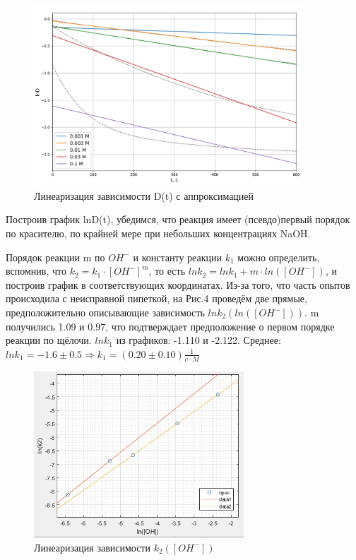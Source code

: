 \documentclass[a4paper, 12pt]{article}
\begin{document}
\begin{figure}[h!]
    \begin{center}
    \includegraphics[width=0.9\textwidth]{1 lnD.png}
    \end{center}
    \caption{Линеаризация зависимости D(t) с аппроксимацией}
\end{figure}

Построив график lnD(t), убедимся, что реакция имеет (псевдо)первый порядок по красителю, по крайней мере при небольших концентрациях NaOH.

Порядок реакции m по $OH^-$ и константу реакции $k_1$ можно определить, вспомнив, что $k_2 = k_1 \cdot [OH^-]^m$, то есть $ln k_2 = ln k_1 + m \cdot ln([OH^-])$, и построив график в соответствующих координатах. Из-за того, что часть опытов происходила с неисправной пипеткой, на Рис.4 проведём две прямые, предположительно описывающие зависимость $ln k_2 (ln([OH^-]))$. m получились 1.09 и 0.97, что подтверждает предположение о первом порядке реакции по щёлочи. $ln k_1$ из графиков: -1.110 и -2.122. Среднее: $ln k_1 = -1.6 \pm 0.5 \Rightarrow k_1 = (0.20\pm 0.10) \frac{1}{c \cdot M}$

\begin{figure}[h!]
    \begin{center}
    \includegraphics[width=0.7\textwidth]{1 lnK2(lnC).png}
    \end{center}
    \caption{Линеаризация зависимости $k_2([OH^-])$ }
\end{figure}
\end{document}
